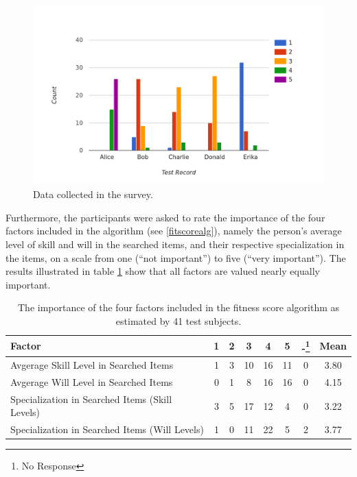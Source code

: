 \begin{figure}[H]
    \centering
    \includegraphics[width=\textwidth]{images/survey_raw.png}
    \caption[Diagram: Survey Data]{Data collected in the survey.}
    \label{survey_raw}
\end{figure}

Furthermore, the participants were asked to rate the importance of the four factors included in the algorithm (see \ref{fitscorealg}), namely the person's average level of skill and will in the searched items, and their respective specialization in the items, on a scale from one (``not important'') to five (``very important''). The results illustrated in table \ref{tab:survey_weight} show that all factors are valued nearly equally important.
\begin{table}[H]
\centering
\begin{tabular}{l||c|c|c|c|c|c||c}
Factor & 1  & 2  & 3  & 4  & 5  & -\footnote{No Response} & Mean \\
\hline
Avgerage Skill Level in Searched Items & 1 & 3 & 10 & 16 & 11 & 0 & 3.80\\
Avgerage Will Level in Searched Items & 0 & 1 & 8 & 16 & 16 & 0 & 4.15\\
Specialization in Searched Items (Skill Levels) & 3 & 5 & 17 & 12 & 4 & 0 & 3.22\\
Specialization in Searched Items (Will Levels) & 1 & 0 & 11 & 22 & 5 & 2 & 3.77\\
\end{tabular}
\caption[Survey: Estimated Importance of Weighting Factors]{The importance of the four factors included in the fitness score algorithm as estimated by 41 test subjects.}
\label{tab:survey_weight}
\end{table}


